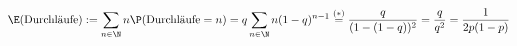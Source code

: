 \begin{solution}
\begin{align*}
        \E(\text{Durchläufe})
        :=
        \sum_{n \in \N}
            n \P(\text{Durchläufe} = n)
        =
        q
        \sum_{n \in \N}
            n (1 - q)^{n-1}
        \stackrel
        {
            (\ast)
        }{=}
        \frac{q}{(1 - (1 - q))^2}
        =
        \frac{q}{q^2}
        =
        \frac{1}{2 p (1 - p)}
\end{align*}

\end{solution}
